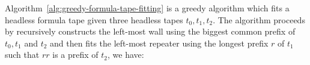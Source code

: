 Algorithm~\ref{alg:greedy-formula-tape-fitting} is a greedy algorithm which fits a headless formula tape given three headless tapes $t_0, t_1, t_2$. The algorithm proceeds by recursively constructs the left-most wall using the biggest common prefix of $t_0, t_1$ and $t_2$ and then fits the left-most repeater using the longest prefix $r$ of $t_1$ such that $rr$ is a prefix of $t_2$, we have:





